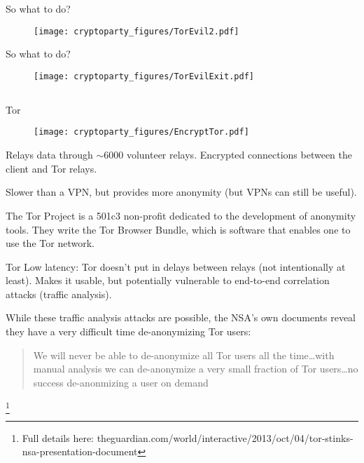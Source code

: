 \documentclass{beamer}
\begin{document}
\begin{frame}{So what to do?}

\begin{figure}
\centering
\texttt{[image: cryptoparty\_figures/TorEvil2.pdf]}
\end{figure}

\end{frame}

\begin{frame}{So what to do?}

\begin{figure}
\centering
\texttt{[image: cryptoparty\_figures/TorEvilExit.pdf]}
\end{figure}

\end{frame}

\subsection{}
\begin{frame}{Tor}

\begin{figure}
\centering
\texttt{[image: cryptoparty\_figures/EncryptTor.pdf]}
\end{figure}

Relays data through $\sim$6000 volunteer relays. Encrypted connections between the client and Tor relays.

Slower than a VPN, but provides more anonymity (but VPNs can still be useful). \bigskip

The Tor Project is a 501c3 non-profit dedicated to the development of anonymity tools. They write the Tor Browser Bundle, which is software that enables one to use the Tor network.

\end{frame}

\begin{frame}{Tor}
Low latency: Tor doesn't put in delays between relays (not intentionally at least). Makes it usable, but potentially vulnerable to end-to-end correlation attacks (traffic analysis).

\bigskip

While these traffic analysis attacks are possible, the NSA's own documents reveal they have a very difficult time de-anonymizing Tor users: \begin{quote} We will never be able to de-anonymize all Tor users all the time\ldots with manual analysis we can de-anonymize a very small fraction of Tor users\ldots no success de-anonmizing a user on demand\end{quote}\footnote{Full details here: theguardian.com/world/interactive/2013/oct/04/tor-stinks-nsa-presentation-document}

\bigskip

\end{frame}
\end{document}
